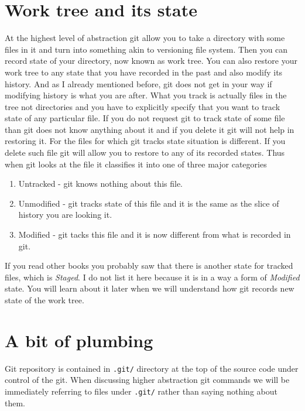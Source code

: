 \documentclass{article}
\theoremstyle{definition}
\begin{document}
        \section{Work tree and its state}
        At the highest level of abstraction git allow you to take a directory with some files in it and turn into
        something akin to versioning file system. Then you can record state of your directory, now known as work tree.
        You can also restore your work tree to any state that you have recorded in the past and also modify its
        history. And as I already mentioned before, git does not get in your way if modifying history is what you are
        after. What you track is actually files in the tree not directories and you have to explicitly specify that you
        want to track state of any particular file. If you do not request git to track state of some file than git does
        not know anything about it and if you delete it git will not help in restoring it. For the files for which git
        tracks state situation is different. If you delete such file git will allow you to restore to any of its
        recorded states. Thus when git looks at the file it classifies it into one of three major categories
        \begin{enumerate}
                \item Untracked - git knows nothing about this file.
                \item Unmodified - git tracks state of this file and it is the same as the slice of history you are looking it.
                \item Modified - git tacks this file and it is now different from what is recorded in git.
        \end{enumerate}
        If you read other books you probably saw that there is another state for tracked files, which is {\em Staged}.
        I do not list it here because it is in a way a form of {\em Modified} state. You will learn about it later when
        we will understand how git records new state of the work tree.

        \section{A bit of plumbing}
        Git repository is contained in \texttt{.git/} directory at the top of the source code under control of the git. When
        discussing higher abstraction git commands we will be immediately referring to files under \texttt{.git/} rather
        than saying nothing about them.
\end{document}
